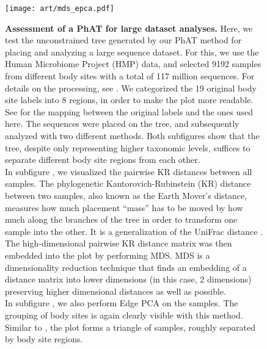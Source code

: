 \begin{figure}[hpbt]
    \centering
    \texttt{[image: art/mds\_epca.pdf]}
    \begin{subfigure}{0pt}
        \label{fig:hmp_mds_epca:sub:mds}
    \end{subfigure}
    \begin{subfigure}{0pt}
        \label{fig:hmp_mds_epca:sub:edge_pca}
    \end{subfigure}
    \caption[Assessment of a \ac{PhAT} for large dataset analyses]{
        \textbf{Assessment of a \ac{PhAT} for large dataset analyses.}
        Here, we test the unconstrained  tree generated by our \ac{PhAT} method
        for placing and analyzing a large sequence dataset.
        For this, we use the Human Microbiome Project (HMP) \citep{Huttenhower2012,Methe2012} data,
        and selected \num{9192} samples from different body sites with a total of 117 million sequences.
        For details on the processing, see .
        We categorized the 19 original body site labels into 8 regions, in order to make the plot more readable.
        See  for the mapping between the original labels and the ones used here.
        The sequences were placed on the tree, and subsequently analyzed with two different methods.
        Both subfigures show that the tree, despite only representing higher taxonomic levels,
        suffices to separate different body site regions from each other.
        \\
        In subfigure , we visualized the pairwise KR distances between all samples.
        The phylogenetic Kantorovich-Rubinstein (KR) distance \citep{Matsen2011a,Evans2012} between two samples,
        also known as the Earth Mover's distance,
        measures how much placement ``mass'' has to be moved by how much along the branches of the tree
        in order to transform one sample into the other.
        It is a generalization of the UniFrac distance \citep{Lozupone2005,Lozupone2007a}.
        The high-dimensional pairwise KR distance matrix was then embedded into the plot by performing \acf{MDS}.
        \ac{MDS} \citep{Mardia1978,Krzanowski1994,Everitt2010} is a dimensionality reduction technique that
        finds an embedding of a distance matrix into lower dimensions (in this case, \num{2} dimensions)
        preserving higher dimensional distances as well as possible.
        \\
        In subfigure , we also perform Edge PCA \citep{Matsen2011a}
        on the samples.
        The grouping of body sites is again clearly visible with this method.
        Similar to , the plot forms a triangle of samples,
        roughly separated by body site regions.
    }
    \label{fig:hmp_mds_epca}
\end{figure}

